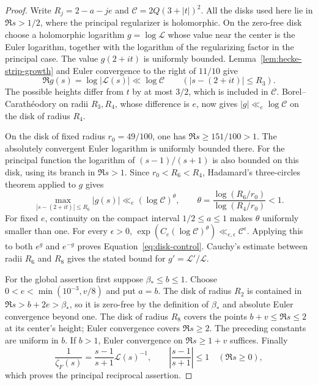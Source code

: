 \documentclass[12pt]{article}
\begin{document}
\begin{proof}
Write $R_j=2-a-je$ and $\mathcal C=2Q(3+|t|)^2$.  All the disks used here
lie in $\Re s>1/2$, where the principal regularizer is holomorphic.  On the
zero-free disk choose a holomorphic logarithm $g=\log\mathcal L$ whose value
near the center is the Euler logarithm, together with the logarithm of the
regularizing factor in the principal case.  The value $g(2+it)$ is uniformly
bounded.  Lemma~\ref{lem:hecke-strip-growth} and Euler convergence to the
right of $11/10$ give
\[
 \Re g(s)=\log|\mathcal L(s)|\ll\log\mathcal C
       \qquad(|s-(2+it)|\le R_3).
\]
The possible heights differ from $t$ by at most $3/2$, which is included in
$\mathcal C$.  Borel--Carath\'eodory on radii $R_3,R_4$, whose difference is
$e$, now gives $|g|\ll_e\log\mathcal C$ on the disk of radius $R_4$.

On the disk of fixed radius $r_0=49/100$, one has $\Re s\ge151/100>1$.
The absolutely convergent Euler logarithm is uniformly bounded there.  For
the principal function the logarithm of $(s-1)/(s+1)$ is also bounded on
this disk, using its branch in $\Re s>1$.  Since
$r_0<R_6<R_4$, Hadamard's three-circles theorem applied to $g$ gives
\[
 \max_{|s-(2+it)|\le R_6}|g(s)|
 \ll_e(\log\mathcal C)^\theta,
 \qquad
 \theta=\frac{\log(R_6/r_0)}{\log(R_4/r_0)}<1.
\]
For fixed $e$, continuity on the compact interval $1/2\le a\le1$ makes
$\theta$ uniformly smaller than one.  For every $\epsilon>0$,
$\exp(C_e(\log\mathcal C)^\theta)\ll_{e,\epsilon}\mathcal C^\epsilon$.
Applying this to both $e^g$ and $e^{-g}$ proves
Equation~\eqref{eq:disk-control}.  Cauchy's estimate between radii $R_6$ and
$R_8$ gives the stated bound for $g'=\mathcal L'/\mathcal L$.

For the global assertion first suppose $\beta_*\le b\le1$.  Choose
$0<e<\min(10^{-3},v/8)$ and put $a=b$.  The disk of radius $R_2$ is contained
in $\Re s>b+2e>\beta_*$, so it is zero-free by the definition of $\beta_*$
and absolute Euler convergence beyond one.  The disk of radius $R_8$ covers
the points $b+v\le\Re s\le2$ at its center's height; Euler convergence
covers $\Re s\ge2$.  The preceding constants are uniform in $b$.  If $b>1$,
Euler convergence on $\Re s\ge1+v$ suffices.  Finally
\[
 \frac1{\zeta_F(s)}=\frac{s-1}{s+1}\mathcal L(s)^{-1},
 \qquad \left|\frac{s-1}{s+1}\right|\le1\quad(\Re s\ge0),
\]
which proves the principal reciprocal assertion.
\end{proof}
\end{document}
